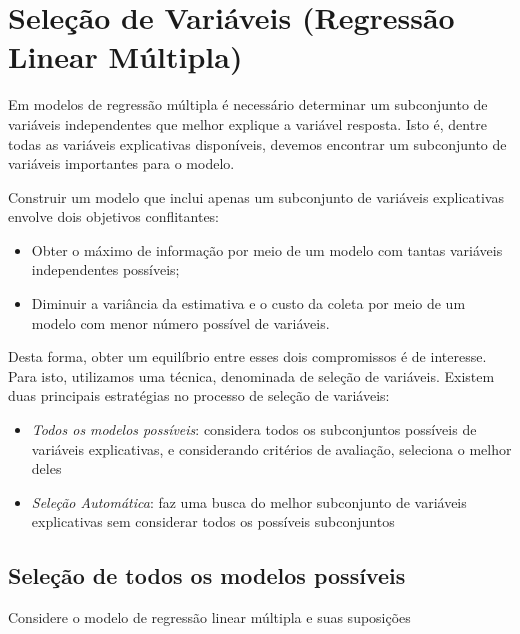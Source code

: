 \documentclass[
]{book}
\providecommand{\tightlist}{%
  \setlength{\itemsep}{0pt}\setlength{\parskip}{0pt}}
\begin{document}
\hypertarget{seleuxe7uxe3o-de-variuxe1veis-regressuxe3o-linear-muxfaltipla}{%
\section{Seleção de Variáveis (Regressão Linear Múltipla)}\label{seleuxe7uxe3o-de-variuxe1veis-regressuxe3o-linear-muxfaltipla}}

Em modelos de regressão múltipla é necessário determinar um subconjunto de variáveis independentes que melhor explique a variável resposta. Isto é, dentre todas as variáveis explicativas disponíveis, devemos encontrar um subconjunto de variáveis importantes para o modelo.

Construir um modelo que inclui apenas um subconjunto de variáveis explicativas envolve dois objetivos conflitantes:

\begin{itemize}
\tightlist
\item
  Obter o máximo de informação por meio de um modelo com tantas variáveis independentes possíveis;
\item
  Diminuir a variância da estimativa e o custo da coleta por meio de um modelo com menor número possível de variáveis.
\end{itemize}

Desta forma, obter um equilíbrio entre esses dois compromissos é de interesse. Para isto, utilizamos uma técnica, denominada de seleção de variáveis. Existem duas principais estratégias no processo de seleção de variáveis:

\begin{itemize}
\tightlist
\item
  \emph{Todos os modelos possíveis}: considera todos os subconjuntos possíveis de variáveis explicativas, e considerando critérios de avaliação, seleciona o melhor deles
\item
  \emph{Seleção Automática}: faz uma busca do melhor subconjunto de variáveis explicativas sem considerar todos os possíveis subconjuntos
\end{itemize}

\hypertarget{seleuxe7uxe3o-de-todos-os-modelos-possuxedveis}{%
\subsection{Seleção de todos os modelos possíveis}\label{seleuxe7uxe3o-de-todos-os-modelos-possuxedveis}}

Considere o modelo de regressão linear múltipla e suas suposições
\end{document}
